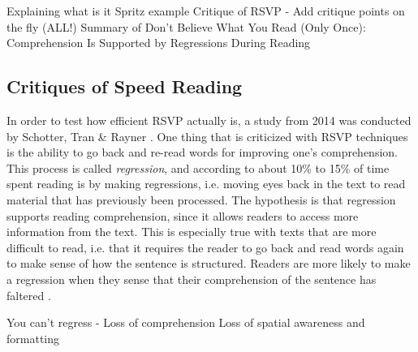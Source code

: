 Explaining what is it
Spritz example
Critique of RSVP - Add critique points on the fly (ALL!)
Summary of Don't Believe What You Read (Only Once): Comprehension Is Supported by Regressions During Reading

\subsection{Critiques of Speed Reading}
In order to test how efficient RSVP actually is, a study from 2014 was conducted by Schotter, Tran \& Rayner \cite{schotter_dont_2014}. One thing that is criticized with RSVP techniques is the ability to go back and re-read words for improving one's comprehension. This process is called \textit{regression}, and according to \cite{schotter_dont_2014} about 10\% to 15\% of time spent reading is by making regressions, i.e. moving eyes back in the text to read material that has previously been processed. The hypothesis is that regression supports reading comprehension, since it allows readers to access more information from the text. This is especially true with texts that are more difficult to read, i.e. that it requires the reader to go back and read words again to make sense of how the sentence is structured. Readers are more likely to make a regression when they sense that their comprehension of the sentence has faltered \cite{schotter_dont_2014}.

You can't regress - Loss of comprehension
Loss of spatial awareness and formatting
